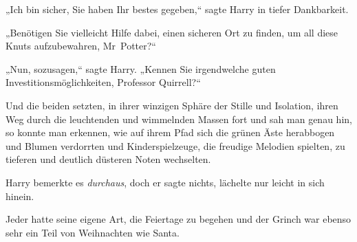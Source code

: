 „Ich bin sicher, Sie haben Ihr bestes gegeben,“ sagte Harry in tiefer Dankbarkeit.

„Benötigen Sie vielleicht Hilfe dabei, einen sicheren Ort zu finden, um all diese Knuts aufzubewahren, Mr~Potter?“

„Nun, sozusagen,“ sagte Harry. „Kennen Sie irgendwelche guten Investitionsmöglichkeiten, Professor Quirrell?“

Und die beiden setzten, in ihrer winzigen Sphäre der Stille und Isolation, ihren Weg durch die leuchtenden und wimmelnden Massen fort und sah man genau hin, so konnte man erkennen, wie auf ihrem Pfad sich die grünen Äste herabbogen und Blumen verdorrten und Kinderspielzeuge, die freudige Melodien spielten, zu tieferen und deutlich düsteren Noten wechselten.

Harry bemerkte es \emph{durchaus}, doch er sagte nichts, lächelte nur leicht in sich hinein.

Jeder hatte seine eigene Art, die Feiertage zu begehen und der Grinch war ebenso sehr ein Teil von Weihnachten wie Santa.

